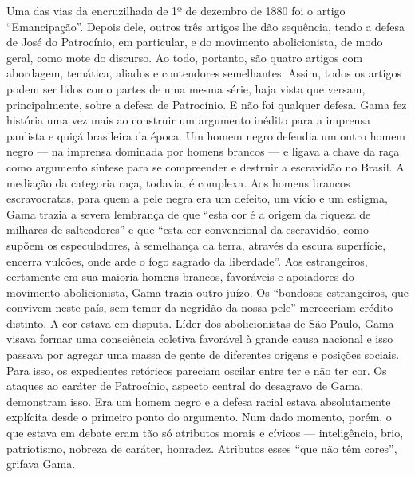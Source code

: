 {\small\noindent
Uma das vias da encruzilhada de 1º de dezembro de 1880 foi o
artigo ``Emancipação''. Depois dele, outros três artigos lhe dão
sequência, tendo a defesa de José do Patrocínio, em particular, e do
movimento abolicionista, de modo geral, como mote do discurso. Ao todo,
portanto, são quatro artigos com abordagem, temática, aliados e
contendores semelhantes. Assim, todos os artigos podem ser lidos como
partes de uma mesma série, haja vista que versam, principalmente, sobre
a defesa de Patrocínio. E não foi qualquer defesa. Gama fez história uma vez
mais ao construir um argumento inédito para a imprensa paulista e quiçá
brasileira da época. Um homem negro defendia um outro homem negro --- na
imprensa dominada por homens brancos --- e ligava a chave da raça como
argumento síntese para se compreender e destruir a escravidão no Brasil.
A mediação da categoria raça, todavia, é complexa. Aos homens brancos
escravocratas, para quem a pele negra era um defeito, um vício e um
estigma, Gama trazia a severa lembrança de que ``esta cor é a origem da
riqueza de milhares de salteadores'' e que ``esta cor convencional da
escravidão, como supõem os especuladores, à semelhança da terra, através
da escura superfície, encerra vulcões, onde arde o fogo sagrado da
liberdade''. Aos estrangeiros, certamente em sua maioria homens brancos,
favoráveis e apoiadores do movimento abolicionista, Gama trazia outro
juízo. Os ``bondosos estrangeiros, que convivem neste país, sem temor da
negridão da nossa pele'' mereceriam crédito distinto. A cor estava em
disputa. Líder dos abolicionistas de São Paulo, Gama visava formar uma
consciência coletiva favorável à grande causa nacional e isso passava
por agregar uma massa de gente de diferentes origens e posições sociais.
Para isso, os expedientes retóricos pareciam oscilar entre ter e não ter
cor. Os ataques ao caráter de Patrocínio, aspecto central do desagravo
de Gama, demonstram isso. Era um homem negro e a defesa racial estava
absolutamente explícita desde o primeiro ponto do argumento. Num dado
momento, porém, o que estava em debate eram tão só atributos morais e
cívicos --- inteligência, brio, patriotismo, nobreza de caráter,
honradez. Atributos esses ``que não têm cores'', grifava Gama.}
\@openrighttrue\makeatother\endgroup

\pagebreak
\mbox{}\vfill
\thispagestyle{empty}

